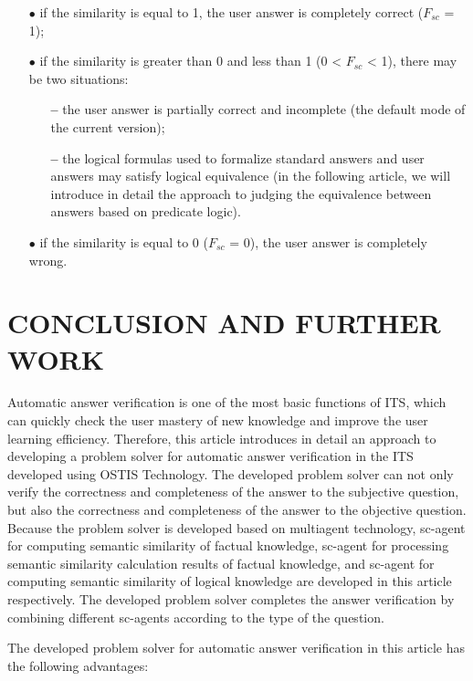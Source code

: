 \documentclass{report}
\begin{document}
\begin{small}
\begin{multicols}{2}
\begin{itemize}
    \item[$\bullet$] if the similarity is equal to 1, the user answer is completely correct ($F_{sc}$ = 1);
    \item[$\bullet$] if the similarity is greater than 0 and less than 1 (0 < $F_{sc}$ < 1), there may be two situations:
    \begin{itemize}
        \item [\textbf{--}] the user answer is partially correct and incomplete (the default mode of the current version);
        \columnbreak
        \item [\textbf{--}] the logical formulas used to formalize standard answers and user answers may satisfy logical equivalence (in the following article, we will introduce in detail the approach to judging the equivalence between answers based on predicate logic).
    \end{itemize}
    \item[$\bullet$] if the similarity is equal to 0 ($F_{sc}$ = 0), the user answer is completely wrong.
\end{itemize}
\section{CONCLUSION AND FURTHER WORK}
\hspace{\parindent}Automatic answer verification is one of the most basic functions of ITS, which can quickly check the user mastery of new
knowledge and improve the user learning efficiency. Therefore,
this article introduces in detail an approach to developing a
problem solver for automatic answer verification in the ITS
developed using OSTIS Technology. The developed problem
solver can not only verify the correctness and completeness of
the answer to the subjective question, but also the correctness
and completeness of the answer to the objective question.
Because the problem solver is developed based on multiagent technology, sc-agent for computing semantic similarity
of factual knowledge, sc-agent for processing semantic similarity calculation results of factual knowledge, and sc-agent
for computing semantic similarity of logical knowledge are
developed in this article respectively. The developed problem
solver completes the answer verification by combining different
sc-agents according to the type of the question.
\par The developed problem solver for automatic answer verification in this article has the following advantages:


\end{multicols}
\end{small}
\end{document}
